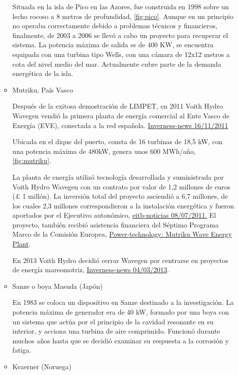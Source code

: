 \begin{itemize}
\begin{itemize}
    Situada en la isla de Pico en las Azores, fue construida en 1998
    sobre un lecho rocoso a 8 metros de profundidad, \autoref{fig:pico}. Aunque en un
    principio no operaba correctamente debido a problemas técnicos y
    financieros, finalmente, de 2003 a 2006 se llevó a cabo un proyecto
    para recuperar el sistema. La potencia máxima de salida es de 400
    KW, se encuentra equipada con una turbina tipo Wells, con una cámara
    de 12x12 metros a cota del nivel medio del mar. Actualmente cubre
    parte de la demanda energética de la isla.



  \item
    Mutriku, País Vasco

    Después de la exitosa demostración de LIMPET, en 2011 Voith Hydro
    Wavegen vendió la primera planta de energía comercial al Ente Vasco
    de Energía (EVE), conectada a la red española.
    \href{https://www.inverness-courier.co.uk/News/Inverness-firm-alunches-first-tidal-wave-project-16112011.htm}{Inverness-news
    16/11/2011}

    Ubicada en el dique del puerto, consta de 16 turbinas de 18,5 kW,
    con una potencia máxima de 480kW, genera unos 600 MWh/año, \autoref{fig:mutriku}.

    La planta de energía utilizó tecnología desarrollada y suministrada
    por Voith Hydro Wavegen con un contrato por valor de 1,2 millones de
    euros (£ 1 millón). La inversión total del proyecto asciendió a 6,7
    millones, de los cuales 2,3 millones correspondieron a la
    instalación energética y fueron aportados por el Ejecutivo
    autonómico,
    \href{http://www.eitb.eus/es/noticias/sociedad/detalle/698089/mutriku-tiene-primera-planta-suministra-energia-olas/}{eitb-noticias
    08/07/2011.} El proyecto, también recibió asistencia financiera del
    Séptimo Programa Marco de la Comisión Europea,
    \href{https://www.power-technology.com/projects/mutriku-wave/}{Power-technology:
    Mutriku Wave Energy Plant}.

    En 2013 Voith Hydro decidió cerrar Wavegen por centrarse en
    proyectos de energía mareomotriz,
    \href{https://www.inverness-courier.co.uk/News/City-job-losses-as-giant-utility-firm-pulls-out-04032013.htm}{Inverness-news
    04/03/2013}.
  \item
    Sanze o boya Masuda (Japón)

    En 1983 se coloca un dispositivo en Sanze destinado a la
    investigación. La potencia máxima de generador era de 40 kW, formado
    por una boya con un sistema que actúa por el principio de la cavidad
    resonante en su interior, y acciona una turbina de aire comprimido.
    Funcionó durante muchos años hasta que se decidió examinar su
    respuesta a la corrosión y fatiga.
  \item
    Kvaerner (Noruega)


\end{itemize}
\end{itemize}
